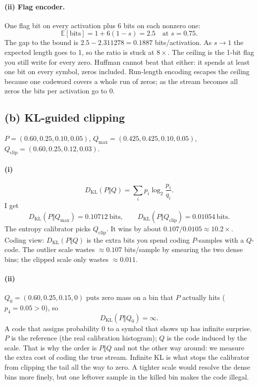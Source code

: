\documentclass[11pt]{article}
\begin{document}
\paragraph{(ii) Flag encoder.}
One flag bit on every activation plus 6 bits on each nonzero one:
\[
\mathbb{E}[\text{bits}]=1+6(1-s)=2.5
\quad\text{at }s=0.75.
\]
The gap to the bound is \(2.5-2.311278=0.1887\) bits/activation.
As \(s\to 1\) the expected length goes to 1, so the ratio is stuck at
\(8\times\). The ceiling is the 1-bit flag you still write for every
zero. Huffman cannot beat that either: it spends at least one bit on
every symbol, zeros included. Run-length encoding escapes the ceiling
because one codeword covers a whole run of zeros; as the stream becomes
all zeros the bits per activation go to 0.

\subsection*{(b) KL-guided clipping}

\(P=(0.60,0.25,0.10,0.05)\),
\(Q_{\max}=(0.425,0.425,0.10,0.05)\),
\(Q_{\mathrm{clip}}=(0.60,0.25,0.12,0.03)\).

\paragraph{(i)}
\[
D_{\mathrm{KL}}(P\Vert Q)=\sum_i p_i\log_2\frac{p_i}{q_i}.
\]
I get
\[
D_{\mathrm{KL}}(P\Vert Q_{\max})=0.10712\ \text{bits},
\qquad
D_{\mathrm{KL}}(P\Vert Q_{\mathrm{clip}})=0.01054\ \text{bits}.
\]
The entropy calibrator picks \(Q_{\mathrm{clip}}\). It wins by about
\(0.107/0.0105\approx 10.2\times\). Coding view: \(D_{\mathrm{KL}}(P\Vert Q)\)
is the extra bits you spend coding \(P\)-samples with a \(Q\)-code. The
outlier scale wastes \(\approx 0.107\) bits/sample by smearing the two
dense bins; the clipped scale only wastes \(\approx 0.011\).

\paragraph{(ii)}
\(Q_0=(0.60,0.25,0.15,0)\) puts zero mass on a bin that \(P\) actually
hits (\(p_4=0.05>0\)), so
\[
D_{\mathrm{KL}}(P\Vert Q_0)=\infty.
\]
A code that assigns probability 0 to a symbol that shows up has
infinite surprise. \(P\) is the reference (the real calibration
histogram); \(Q\) is the code induced by the scale. That is why the
order is \(P\Vert Q\) and not the other way around: we measure the
extra cost of coding the true stream. Infinite KL is what stops the
calibrator from clipping the tail all the way to zero. A tighter scale
would resolve the dense bins more finely, but one leftover sample in
the killed bin makes the code illegal.
\end{document}
